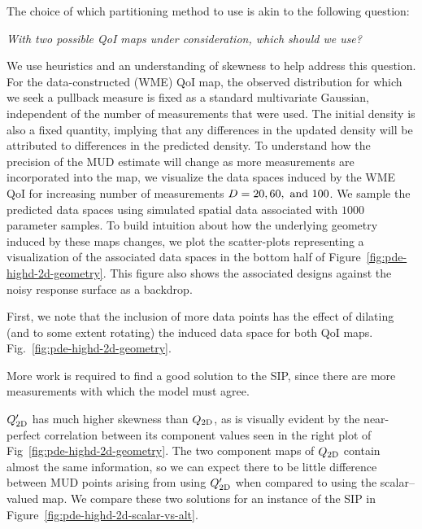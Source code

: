 The choice of which partitioning method to use is akin to the following question:
\begin{center}
\emph{With two possible QoI maps under consideration, which should we use?}
\end{center}

We use heuristics and an understanding of skewness to help address this question.
For the data-constructed (WME) QoI map, the observed distribution for which we seek a pullback measure is fixed as a standard multivariate Gaussian, independent of the number of measurements that were used.
The initial density is also a fixed quantity, implying that any differences in the updated density will be attributed to differences in the predicted density.
To understand how the precision of the MUD estimate will change as more measurements are incorporated into the map, we visualize the data spaces induced by the WME QoI for increasing number of measurements $D = 20, 60, \text{ and } 100$.
We sample the predicted data spaces using simulated spatial data associated with $1000$ parameter samples.
To build intuition about how the underlying geometry induced by these maps changes, we plot the scatter-plots representing a visualization of the associated data spaces in the bottom half of Figure~\ref{fig:pde-highd-2d-geometry}.
This figure also shows the associated designs against the noisy response surface as a backdrop.

First, we note that the inclusion of more data points has the effect of dilating (and to some extent rotating) the induced data space for both QoI maps.
Fig.~\ref{fig:pde-highd-2d-geometry}.

More work is required to find a good solution to the SIP, since there are more measurements with which the model must agree.


$Q_\text{2D}^\prime$ has much higher skewness than $Q_\text{2D}$, as is visually evident by the near-perfect correlation between its component values seen in the right plot of Fig~\ref{fig:pde-highd-2d-geometry}.
The two component maps of $Q_\text{2D}$ contain almost the same information, so we can expect there to be little difference between MUD points arising from using $Q_\text{2D}^\prime$ when compared to using the scalar--valued map.
We compare these two solutions for an instance of the SIP in Figure~\ref{fig:pde-highd-2d-scalar-vs-alt}.

